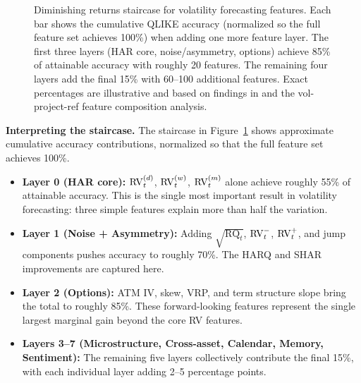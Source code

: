 \begin{figure}[ht]
\caption{Diminishing returns staircase for volatility forecasting features. Each bar shows the cumulative QLIKE accuracy (normalized so the full feature set achieves 100\%) when adding one more feature layer. The first three layers (HAR core, noise/asymmetry, options) achieve 85\% of attainable accuracy with roughly 20 features. The remaining four layers add the final 15\% with 60--100 additional features. Exact percentages are illustrative and based on findings in \citet{ChristensenSiggaardVeliyev2023} and the vol-project-ref feature composition analysis.}
\label{fig:diminishing-returns-ch10}
\end{figure}

\textbf{Interpreting the staircase.}
The staircase in Figure~\ref{fig:diminishing-returns-ch10} shows approximate cumulative accuracy contributions, normalized so that the full feature set achieves 100\%.

\begin{itemize}[nosep]
  \item \textbf{Layer 0 (HAR core):} $\operatorname{RV}_t^{(d)}$, $\operatorname{RV}_t^{(w)}$, $\operatorname{RV}_t^{(m)}$ alone achieve roughly 55\% of attainable accuracy.
    This is the single most important result in volatility forecasting: three simple features explain more than half the variation.
  \item \textbf{Layer 1 (Noise + Asymmetry):} Adding $\sqrt{\operatorname{RQ}_t}$, $\operatorname{RV}_t^-$, $\operatorname{RV}_t^+$, and jump components pushes accuracy to roughly 70\%.
    The HARQ and SHAR improvements are captured here.
  \item \textbf{Layer 2 (Options):} ATM IV, skew, VRP, and term structure slope bring the total to roughly 85\%.
    These forward-looking features represent the single largest marginal gain beyond the core RV features.
  \item \textbf{Layers 3--7 (Microstructure, Cross-asset, Calendar, Memory, Sentiment):} The remaining five layers collectively contribute the final 15\%, with each individual layer adding 2--5 percentage points.
\end{itemize}

